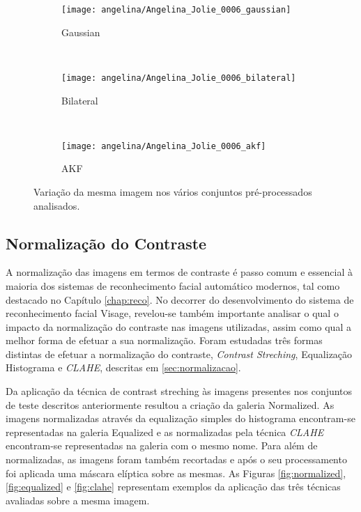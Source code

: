 \begin{figure}[t]
        \begin{subfigure}[b]{0.2\textwidth}
                \centering
                \texttt{[image: angelina/Angelina\_Jolie\_0006\_gaussian]}
                \caption{Gaussian}
                \label{fig:gaussian} 
        \end{subfigure}
        ~ ~
        \begin{subfigure}[b]{0.2\textwidth}
                \centering
                \texttt{[image: angelina/Angelina\_Jolie\_0006\_bilateral]}
                \caption{Bilateral}
                \label{fig:bilateral}
        \end{subfigure}
        ~ ~
        \begin{subfigure}[b]{0.2\textwidth}
                \centering
                \texttt{[image: angelina/Angelina\_Jolie\_0006\_akf]}
                \caption{AKF}
                \label{fig:akf}
        \end{subfigure}
        \caption{Variação da mesma imagem nos vários conjuntos pré-processados analisados.}
        \label{fig:galeriaspreprocessadas}   
\end{figure}

\subsection{Normalização do Contraste} \label{sec:pre-normalizacao}
A normalização das imagens em termos de contraste é passo comum e essencial à maioria dos sistemas de reconhecimento facial automático modernos, tal como destacado no Capítulo \ref{chap:reco}. No decorrer do desenvolvimento do sistema de reconhecimento facial Visage, revelou-se também importante analisar o qual o impacto da normalização do contraste nas imagens utilizadas, assim como qual a melhor forma de efetuar a sua normalização. Foram estudadas três formas distintas de efetuar a normalização do contraste, \textit{Contrast Streching}, Equalização Histograma e \textit{CLAHE}, descritas em \ref{sec:normalizacao}.

Da aplicação da técnica de contrast streching às imagens presentes nos conjuntos de teste descritos anteriormente resultou a criação da galeria Normalized. As imagens normalizadas através da equalização simples do histograma encontram-se representadas na galeria Equalized e as normalizadas pela técnica \textit{CLAHE} encontram-se representadas na galeria com o mesmo nome. Para além de normalizadas, as imagens foram também recortadas e após o seu processamento foi aplicada uma máscara elíptica sobre as mesmas. As Figuras \ref{fig:normalized}, \ref{fig:equalized} e \ref{fig:clahe} representam exemplos da aplicação das três técnicas avaliadas sobre a mesma imagem.

